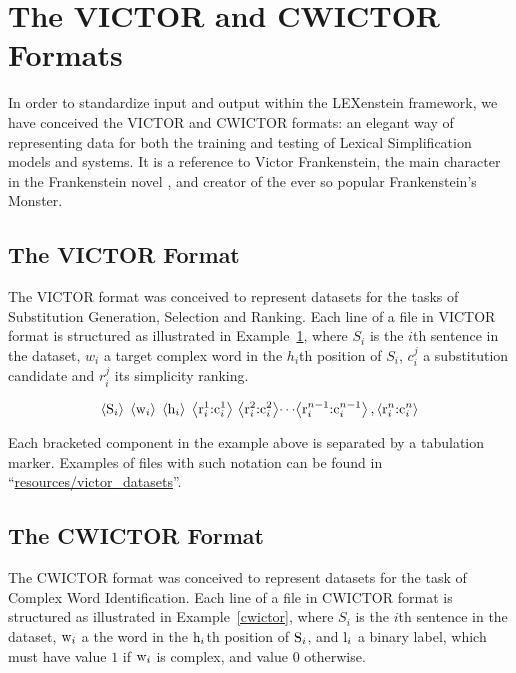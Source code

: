 \chapter{The VICTOR and CWICTOR Formats}
\label{victor}

In order to standardize input and output within the LEXenstein framework, we have conceived the VICTOR and CWICTOR formats: an elegant way of representing data for both the training and testing of Lexical Simplification models and systems. It is a reference to Victor Frankenstein, the main character in the Frankenstein novel \cite{frankenstein}, and creator of the ever so popular Frankenstein's Monster.

\section{The VICTOR Format}

The VICTOR format was conceived to represent datasets for the tasks of Substitution Generation, Selection and Ranking. Each line of a file in VICTOR format is structured as illustrated in Example~\ref{victor}, where $S_{i}$ is the $i$th sentence in the dataset, $w_{i}$ a target complex word in the $h_{i}$th position of $S_{i}$, $c_{i}^{j}$ a substitution candidate and $r_{i}^{j}$ its simplicity ranking.

\begin{equation}
\label{victor}
\left \langle \textup{S}_{i} \right \rangle\; \left \langle \textup{w}_{i} \right \rangle\; \left \langle \textup{h}_{i} \right \rangle\; \left \langle \textup{r}_{i}^{1}\textup{:c}_{i}^{1} \right \rangle\, \left \langle \textup{r}_{i}^{2}\textup{:c}_{i}^{2} \right \rangle\!  \cdots \!  \left \langle \textup{r}_{i}^{n-1}\textup{:c}_{i}^{n-1} \right \rangle, \left \langle \textup{r}_{i}^{n}\textup{:c}_{i}^{n} \right \rangle
\end{equation}

Each bracketed component in the example above is separated by a tabulation marker. Examples of files with such notation can be found in ``\url{resources/victor_datasets}''.




\section{The CWICTOR Format}

The CWICTOR format was conceived to represent datasets for the task of Complex Word Identification. Each line of a file in CWICTOR format is structured as illustrated in Example~\ref{cwictor}, where $S_{i}$ is the $i$th sentence in the dataset, $\textup{w}_{i}$ a the word in the $\textup{h}_{i}$th position of $\textup{S}_{i}$, and $\textup{l}_{i}$ a binary label, which must have value $1$ if $\textup{w}_{i}$ is complex, and value $0$ otherwise.

